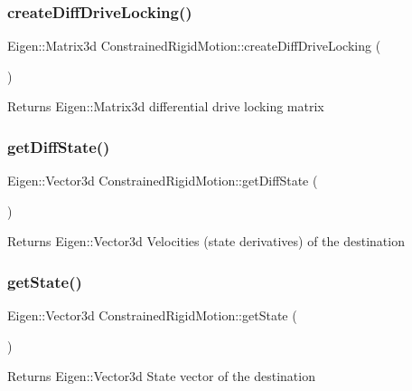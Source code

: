 \subsubsection{\texorpdfstring{create\+Diff\+Drive\+Locking()}{createDiffDriveLocking()}}
{\footnotesize\ttfamily Eigen\+::\+Matrix3d Constrained\+Rigid\+Motion\+::create\+Diff\+Drive\+Locking (\begin{DoxyParamCaption}{ }\end{DoxyParamCaption})\hspace{0.3cm}{\ttfamily [static]}}

\begin{DoxyReturn}{Returns}
Eigen\+::\+Matrix3d differential drive locking matrix 
\end{DoxyReturn}
\mbox{\label{group__RigidMotion_ga59bdced4bb2e565bc39312e5328507ef}} 
\subsubsection{\texorpdfstring{get\+Diff\+State()}{getDiffState()}}
{\footnotesize\ttfamily Eigen\+::\+Vector3d Constrained\+Rigid\+Motion\+::get\+Diff\+State (\begin{DoxyParamCaption}{ }\end{DoxyParamCaption})}

\begin{DoxyReturn}{Returns}
Eigen\+::\+Vector3d Velocities (state derivatives) of the destination 
\end{DoxyReturn}
\mbox{\label{group__RigidMotion_gabde902d2f91035cd5054a33dab4acc48}} 
\subsubsection{\texorpdfstring{get\+State()}{getState()}}
{\footnotesize\ttfamily Eigen\+::\+Vector3d Constrained\+Rigid\+Motion\+::get\+State (\begin{DoxyParamCaption}{ }\end{DoxyParamCaption})}

\begin{DoxyReturn}{Returns}
Eigen\+::\+Vector3d State vector of the destination 
\end{DoxyReturn}
\mbox{\label{group__RigidMotion_gac71f6e395c1d63f54cfb837b5526236b}} 
